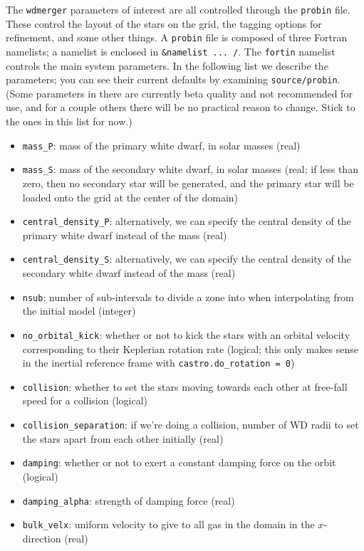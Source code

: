 \documentclass[12pt]{book}
\begin{document}
The \texttt{wdmerger} parameters of interest are all controlled through the \texttt{probin} file. 
These control the layout of the stars on the grid, the tagging options for refinement, and some other things. 
A \texttt{probin} file is composed of three Fortran namelists; a namelist is enclosed in 
\texttt{\&namelist ... /}. The \texttt{fortin} namelist controls the main system parameters. 
In the following list we describe the parameters; you can see their current defaults by 
examining \texttt{source/probin}. (Some parameters in there are currently beta quality and 
not recommended for use, and for a couple others there will be no practical reason to change. 
Stick to the ones in this list for now.)
\begin{itemize}
  \item \texttt{mass\_P}: mass of the primary white dwarf, in solar masses (real)
  \item \texttt{mass\_S}: mass of the secondary white dwarf, in solar masses (real; if less than zero, 
    then no secondary star will be generated, and the primary star will be loaded onto the grid at the 
    center of the domain)
  \item \texttt{central\_density\_P}: alternatively, we can specify the central density of the primary white dwarf instead of the mass (real)
  \item \texttt{central\_density\_S}: alternatively, we can specify the central density of the secondary white dwarf instead of the mass (real)
  \item \texttt{nsub}: number of sub-intervals to divide a zone into when interpolating from the initial model (integer)
  \item \texttt{no\_orbital\_kick}: whether or not to kick the stars with an orbital velocity corresponding to their 
    Keplerian rotation rate (logical; this only makes sense in the inertial reference frame with \texttt{castro.do\_rotation = 0})
  \item \texttt{collision}: whether to set the stars moving towards each other at free-fall speed for a collision (logical)
  \item \texttt{collision\_separation}: if we're doing a collision, number of WD radii to set the stars apart from each other initially (real)
  \item \texttt{damping}: whether or not to exert a constant damping force on the orbit (logical)
  \item \texttt{damping\_alpha}: strength of damping force (real)
  \item \texttt{bulk\_velx}: uniform velocity to give to all gas in the domain in the $x$-direction (real)

\end{itemize}
\end{document}
